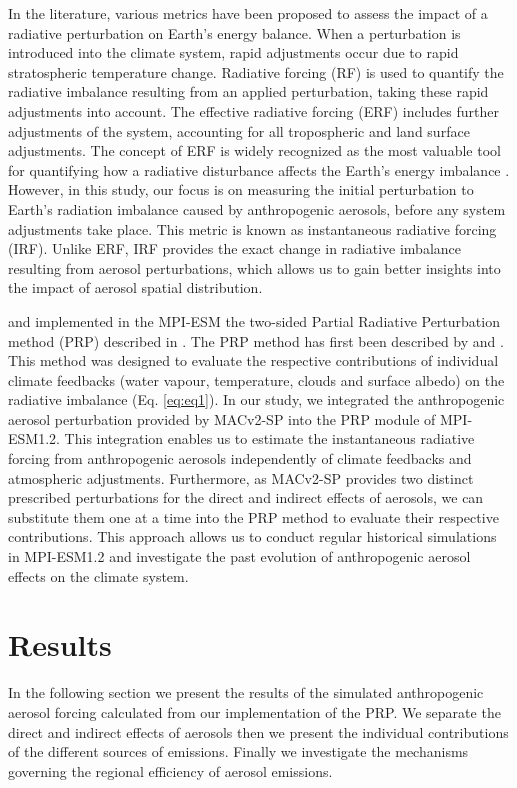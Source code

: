 \documentclass[draft]{agujournal2019}
\begin{document}
      In the literature, various metrics have been proposed to assess the impact of a radiative perturbation on Earth's energy balance. When a perturbation is introduced into the climate system, rapid adjustments occur due to rapid stratospheric temperature change. Radiative forcing (RF) is used to quantify the radiative imbalance resulting from an applied perturbation, taking these rapid adjustments into account. The effective radiative forcing (ERF) includes further adjustments of the system, accounting for all tropospheric and land surface adjustments. The concept of ERF is widely recognized as the most valuable tool for quantifying how a radiative disturbance affects the Earth's energy imbalance \cite{Myhre_2013,Boucher_2013,Forster_2016}. However, in this study, our focus is on measuring the initial perturbation to Earth's radiation imbalance caused by anthropogenic aerosols, before any system adjustments take place. This metric is known as instantaneous radiative forcing (IRF). Unlike ERF, IRF provides the exact change in radiative imbalance resulting from aerosol perturbations, which allows us to gain better insights into the impact of aerosol spatial distribution.

       and  implemented in the MPI-ESM the two-sided Partial Radiative Perturbation method (PRP) described in . The PRP method has first been described by  and . This method was designed to evaluate the respective contributions of individual climate feedbacks (water vapour, temperature, clouds and surface albedo) on the radiative imbalance (Eq. \ref{eq:eq1}). In our study, we integrated the anthropogenic aerosol perturbation provided by MACv2-SP into the PRP module of MPI-ESM1.2. This integration enables us to estimate the instantaneous radiative forcing from anthropogenic aerosols independently of climate feedbacks and atmospheric adjustments. Furthermore, as MACv2-SP provides two distinct prescribed perturbations for the direct and indirect effects of aerosols, we can substitute them one at a time into the PRP method to evaluate their respective contributions. This approach allows us to conduct regular historical simulations in MPI-ESM1.2 and investigate the past evolution of anthropogenic aerosol effects on the climate system.

\section{Results}
      In the following section we present the results of the simulated anthropogenic aerosol forcing calculated from our implementation of the PRP. We separate the direct and indirect effects of aerosols then we present the individual contributions of the different sources of emissions. Finally we investigate the mechanisms governing the regional efficiency of aerosol emissions.
\end{document}
